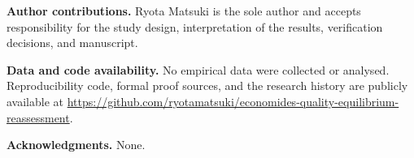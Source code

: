 \documentclass[11pt]{article}
\begin{document}
\noindent\textbf{Author contributions.} Ryota Matsuki is the sole author and
accepts responsibility for the study design, interpretation of the
results, verification decisions, and manuscript.

\noindent\textbf{Data and code availability.} No empirical data were
collected or analysed. Reproducibility code, formal proof sources,
and the research history are publicly available at
\url{https://github.com/ryotamatsuki/economides-quality-equilibrium-reassessment}.

\noindent\textbf{Acknowledgments.} None.



\end{document}
